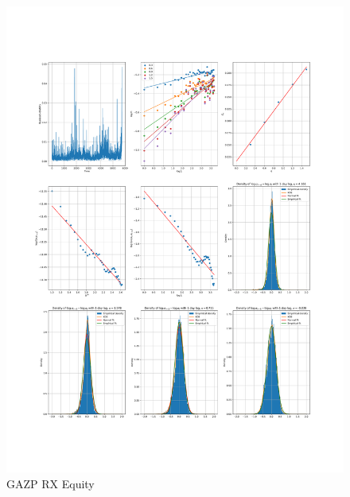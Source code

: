     \begin{figure}[h]
        \centering
        \includegraphics[width=\textwidth]{fig/GAZP RX Equity.pdf}
        \caption{GAZP RX Equity}
    \end{figure} 
        
